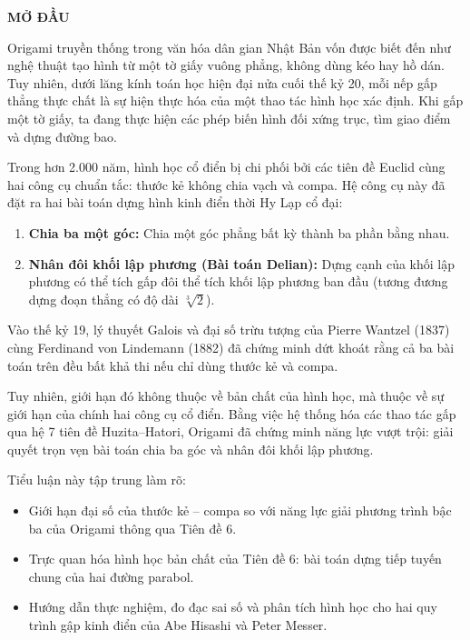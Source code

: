 \begin{center}
{{\bf\fontsize{14pt}{14.5pt}\selectfont 
MỞ ĐẦU}}
\end{center}



Origami truyền thống trong văn hóa dân gian Nhật Bản vốn được biết đến như nghệ thuật tạo hình từ một tờ giấy vuông phẳng, không dùng kéo hay hồ dán. Tuy nhiên, dưới lăng kính toán học hiện đại nửa cuối thế kỷ 20, mỗi nếp gấp thẳng thực chất là sự hiện thực hóa của một thao tác hình học xác định. Khi gấp một tờ giấy, ta đang thực hiện các phép biến hình đối xứng trục, tìm giao điểm và dựng đường bao.

Trong hơn 2.000 năm, hình học cổ điển bị chi phối bởi các tiên đề Euclid cùng hai công cụ chuẩn tắc: thước kẻ không chia vạch và compa. Hệ công cụ này đã đặt ra hai bài toán dựng hình kinh điển thời Hy Lạp cổ đại:
\begin{enumerate}
    \item \textbf{Chia ba một góc:} Chia một góc phẳng bất kỳ thành ba phần bằng nhau.
    \item \textbf{Nhân đôi khối lập phương (Bài toán Delian):} Dựng cạnh của khối lập phương có thể tích gấp đôi thể tích khối lập phương ban đầu (tương đương dựng đoạn thẳng có độ dài $\sqrt[3]{2}$).
\end{enumerate}

Vào thế kỷ 19, lý thuyết Galois và đại số trừu tượng của Pierre Wantzel (1837) cùng Ferdinand von Lindemann (1882) đã chứng minh dứt khoát rằng cả ba bài toán trên đều bất khả thi nếu chỉ dùng thước kẻ và compa. 

Tuy nhiên, giới hạn đó không thuộc về bản chất của hình học, mà thuộc về sự giới hạn của chính hai công cụ cổ điển. Bằng việc hệ thống hóa các thao tác gấp qua hệ 7 tiên đề Huzita--Hatori, Origami đã chứng minh năng lực vượt trội: giải quyết trọn vẹn bài toán chia ba góc và nhân đôi khối lập phương. 

Tiểu luận này tập trung làm rõ:
\begin{itemize}
    \item Giới hạn đại số của thước kẻ -- compa so với năng lực giải phương trình bậc ba của Origami thông qua Tiên đề 6.
    \item Trực quan hóa hình học bản chất của Tiên đề 6: bài toán dựng tiếp tuyến chung của hai đường parabol.
    \item Hướng dẫn thực nghiệm, đo đạc sai số và phân tích hình học cho hai quy trình gập kinh điển của Abe Hisashi và Peter Messer.
\end{itemize}